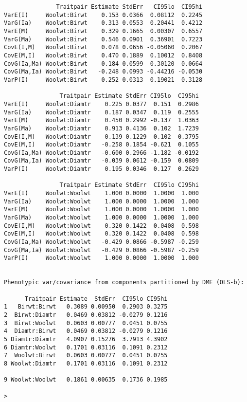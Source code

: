 \documentclass[titlepage]{article}  %
\begin{document}
\begin{verbatim}
               Traitpair Estimate StdErr   CI95lo  CI95hi
VarE(I)     Woolwt:Birwt    0.153 0.0366  0.08112  0.2245
VarG(Ia)    Woolwt:Birwt    0.313 0.0553  0.20441  0.4212
VarE(M)     Woolwt:Birwt    0.329 0.1665  0.00307  0.6557
VarG(Ma)    Woolwt:Birwt    0.546 0.0901  0.36901  0.7223
CovE(I,M)   Woolwt:Birwt    0.078 0.0656 -0.05060  0.2067
CovE(M,I)   Woolwt:Birwt    0.470 0.1889  0.10012  0.8408
CovG(Ia,Ma) Woolwt:Birwt   -0.184 0.0599 -0.30120 -0.0664
CovG(Ma,Ia) Woolwt:Birwt   -0.248 0.0993 -0.44216 -0.0530
VarP(I)     Woolwt:Birwt    0.252 0.0313  0.19021  0.3128

                Traitpair Estimate StdErr CI95lo  CI95hi
VarE(I)     Woolwt:Diamtr    0.225 0.0377  0.151  0.2986
VarG(Ia)    Woolwt:Diamtr    0.187 0.0347  0.119  0.2555
VarE(M)     Woolwt:Diamtr    0.450 0.2992 -0.137  1.0363
VarG(Ma)    Woolwt:Diamtr    0.913 0.4136  0.102  1.7239
CovE(I,M)   Woolwt:Diamtr    0.139 0.1229 -0.102  0.3795
CovE(M,I)   Woolwt:Diamtr   -0.258 0.1854 -0.621  0.1055
CovG(Ia,Ma) Woolwt:Diamtr   -0.600 0.2966 -1.182 -0.0192
CovG(Ma,Ia) Woolwt:Diamtr   -0.039 0.0612 -0.159  0.0809
VarP(I)     Woolwt:Diamtr    0.195 0.0346  0.127  0.2629

                Traitpair Estimate StdErr  CI95lo CI95hi
VarE(I)     Woolwt:Woolwt    1.000 0.0000  1.0000  1.000
VarG(Ia)    Woolwt:Woolwt    1.000 0.0000  1.0000  1.000
VarE(M)     Woolwt:Woolwt    1.000 0.0000  1.0000  1.000
VarG(Ma)    Woolwt:Woolwt    1.000 0.0000  1.0000  1.000
CovE(I,M)   Woolwt:Woolwt    0.320 0.1422  0.0408  0.598
CovE(M,I)   Woolwt:Woolwt    0.320 0.1422  0.0408  0.598
CovG(Ia,Ma) Woolwt:Woolwt   -0.429 0.0866 -0.5987 -0.259
CovG(Ma,Ia) Woolwt:Woolwt   -0.429 0.0866 -0.5987 -0.259
VarP(I)     Woolwt:Woolwt    1.000 0.0000  1.0000  1.000


Phenotypic var/covariance from components partitioned by DME (OLS-b):

      Traitpair Estimate  StdErr  CI95lo CI95hi
1   Birwt:Birwt   0.3089 0.00950  0.2903 0.3275
2  Birwt:Diamtr   0.0469 0.03812 -0.0279 0.1216
3  Birwt:Woolwt   0.0603 0.00777  0.0451 0.0755
4  Diamtr:Birwt   0.0469 0.03812 -0.0279 0.1216
5 Diamtr:Diamtr   4.0907 0.15276  3.7913 4.3902
6 Diamtr:Woolwt   0.1701 0.03116  0.1091 0.2312
7  Woolwt:Birwt   0.0603 0.00777  0.0451 0.0755
8 Woolwt:Diamtr   0.1701 0.03116  0.1091 0.2312

9 Woolwt:Woolwt   0.1861 0.00635  0.1736 0.1985

> 
\end{verbatim}
\end{document}
